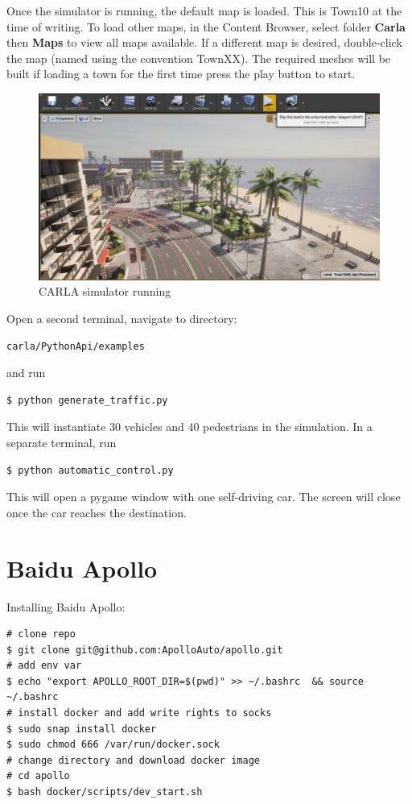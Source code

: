 Once the simulator is running, the default map is loaded. This is Town10 at the time of writing. To load other maps, in the Content Browser, select folder \textbf{Carla} then \textbf{Maps} to view all maps available. If a different map is desired, double-click the map (named using the convention TownXX). The required meshes will be built if loading a town for the first time  press the play button to start. 

\begin{figure}[h!]
\centering
\includegraphics[width=\textwidth]{Figures/carla-play.png}
\caption{CARLA simulator running}
\label{fig:carla-play}
\end{figure}

Open a second terminal, navigate to directory:
\begin{verbatim}
carla/PythonApi/examples
\end{verbatim}
and run
\begin{verbatim}
$ python generate_traffic.py
\end{verbatim}
This will instantiate 30 vehicles and 40 pedestrians in the simulation. In a separate terminal, run
\begin{verbatim}
$ python automatic_control.py
\end{verbatim}
This will open a pygame window with one self-driving car. The screen will close once the car reaches the destination.

\section{Baidu Apollo}

Installing Baidu Apollo:
\begin{verbatim}
# clone repo
$ git clone git@github.com:ApolloAuto/apollo.git
# add env var
$ echo "export APOLLO_ROOT_DIR=$(pwd)" >> ~/.bashrc  && source ~/.bashrc
# install docker and add write rights to socks
$ sudo snap install docker
$ sudo chmod 666 /var/run/docker.sock
# change directory and download docker image
# cd apollo
$ bash docker/scripts/dev_start.sh 
\end{verbatim}

